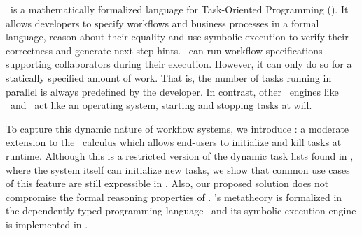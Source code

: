 %
%
\TOPHAT\ is a mathematically formalized language for Task-Oriented Programming (\TOP).
It allows developers to specify workflows and business processes in a formal language,
reason about their equality
and use symbolic execution to verify their correctness and generate next-step hints.
\TOPHAT\ can run workflow specifications supporting collaborators during their execution.
However, it can only do so for a statically specified amount of work.
That is, the number of tasks running in parallel is always predefined by the developer.
In contrast, other \TOP\ engines like \ITASKS\ and \MTASKS\ act like an operating system,
starting and stopping tasks at will.

To capture this dynamic nature of workflow systems,
we introduce \DYNTOPHAT:
a moderate extension to the \TOPHAT\ calculus which allows end-users to initialize and kill tasks at runtime.
Although this is a restricted version of the dynamic task lists found in \ITASKS,
where the system itself can initialize new tasks,
we show that common use cases of this feature are still expressible in \DYNTOPHAT.
Also, our proposed solution does not compromise the formal reasoning properties of \TOPHAT.
\TOPHAT's metatheory is formalized in the dependently typed programming language \IDRIS\
and its symbolic execution engine is implemented in \HASKELL.


